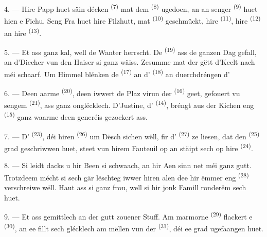 4. --- Hire Papp huet säin décken  \textsuperscript{(7)} mat
dem  \textsuperscript{(8)} ugedoen, an an senger 
\textsuperscript{(9)} huet hien e Fichu. Seng Fra huet hire Filzhutt, mat
 \textsuperscript{(10)} geschmückt, hire 
\textsuperscript{(11)}, hire  \textsuperscript{(12)} an hire
 \textsuperscript{(13)}.

5. --- Et ass ganz kal, well de Wanter herrscht. De 
\textsuperscript{(19)} ass de ganzen Dag gefall, an d'Diecher vun den Haiser si ganz
wäiss. Zesumme mat der  gëtt d'Keelt nach méi schaarf. Um Himmel
blénken de  \textsuperscript{(17)} an d'
\textsuperscript{(18)} an duerchdréngen d'

\VUsaut{4.2mm}
\VUsaut{3.0mm}

6. --- Deen aarme  \textsuperscript{(20)}, deen iwwert de Plaz
virun der  \textsuperscript{(16)} geet, gefouert vu sengem
 \textsuperscript{(21)}, ass ganz onglécklech. D'Justine,
d' \textsuperscript{(14)}, bréngt aus der Kichen eng
 \textsuperscript{(15)} ganz waarme  deen
generéis gezockert ass.

7. --- D' \textsuperscript{(23)}, déi hiren 
\textsuperscript{(26)} um Dësch sichen wëll, fir d'
\textsuperscript{(27)} ze liesen, dat den  \textsuperscript{(25)} grad
geschriwwen huet, steet vun hirem Fauteuil op an stäipt sech op hire 
\textsuperscript{(24)}.

8. --- Si leidt dacks u  hir Been si schwaach, an hir Aen sinn net méi ganz gutt. Trotzdeem mécht si
sech gär lëschteg iwwer hiren alen  dee hir ëmmer eng
 \textsuperscript{(28)} verschreiwe wëll. Haut ass si ganz frou, well
si hir jonk Famill ronderëm sech huet.

9. --- Et ass gemittlech an der gutt zouener Stuff. Am marmorne 
\textsuperscript{(29)} flackert e  \textsuperscript{(30)}, an ee
fillt sech glécklech am mëllen  vun der 
\textsuperscript{(31)}, déi ee grad ugefaangen huet.

